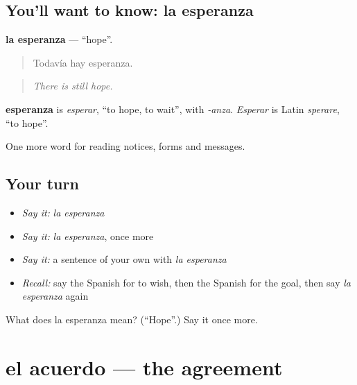 \subsection*{You'll want to know: la esperanza}
\textbf{la esperanza} — \textquotedblleft{}hope\textquotedblright{}.

\begin{quote}
Todavía hay esperanza.
\end{quote}

\begin{quote}
\emph{There is still hope.}
\end{quote}

\begin{cousinweb}
\textbf{esperanza} is \emph{esperar}, \textquotedblleft{}to hope, to wait\textquotedblright{}, with \emph{-anza}. \emph{Esperar} is Latin \emph{sperare}, \textquotedblleft{}to hope\textquotedblright{}.
\end{cousinweb}

\begin{grammarlens}[title={What you've built}]
One more word for reading notices, forms and messages.
\end{grammarlens}

\subsection*{Your turn}
\begin{itemize}
\raggedright
  \item \emph{Say it:} \emph{la esperanza}
  \item \emph{Say it:} \emph{la esperanza}, once more
  \item \emph{Say it:} a sentence of your own with \emph{la esperanza}
  \item \emph{Recall:} say the Spanish for to wish, then the Spanish for the goal, then say \emph{la esperanza} again
\end{itemize}

\begin{tcolorbox}[breakable,colback=teal!4,colframe=teal!35!black,title={Before you move on}]
What does la esperanza mean? (\textquotedblleft{}Hope\textquotedblright{}.) Say it once more.
\end{tcolorbox}
\section[el acuerdo]{el acuerdo — the agreement}

\label{lesson:ES-C509-acuerdo}



